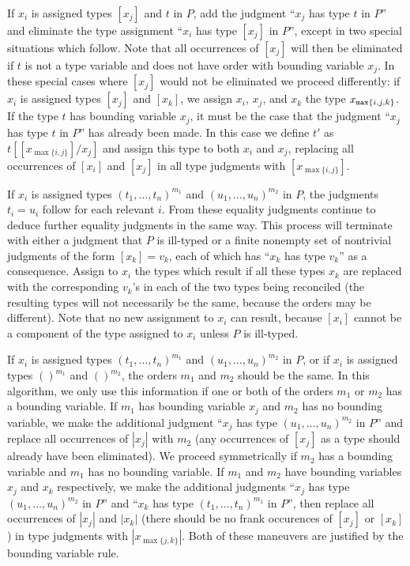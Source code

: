 \documentclass{article}
\begin{document}
\begin{description}
If $x_i$ is assigned types $[x_j]$ and $t$ in $P$, add the judgment
``$x_j$ has type $t$ in $P$'' and eliminate the type assignment
``$x_i$ has type $[x_j]$ in $P$'', except in two special situations
which follow.  Note that all occurrences of $[x_j]$ will then be
eliminated if $t$ is not a type variable and does not have order with
bounding variable $x_j$.  In these special cases where $[x_j]$ would
not be eliminated we proceed differently: if $x_i$ is assigned types
$[x_j]$ and $[x_k]$, we assign $x_i$, $x_j$, and $x_k$ the type
$x_{{\tt max}\{i,j,k\}}$.  If the type $t$ has bounding variable
$x_j$, it must be the case that the judgment ``$x_j$ has type $t$ in
$P$'' has already been made.  In this case we define $t'$ as
$t[[x_{\max\{i,j\}}]/x_j]$ and assign this type to both $x_i$ and
$x_j$, replacing all occurrences of $[x_i]$ and $[x_j]$ in all type
judgments with $[x_{\max\{i,j\}}]$.

If $x_i$ is assigned types $(t_1,\ldots,t_n)^{m_1}$ and
$(u_1,\ldots,u_n)^{m_2}$ in $P$, the judgments $t_i=u_i$ follow for
each relevant $i$.  From these equality judgments continue to deduce
further equality judgments in the same way.  This process will
terminate with either a judgment that $P$ is ill-typed or a finite
nonempty set of nontrivial judgments of the form $[x_k] = v_k$, each
of which has ``$x_k$ has type $v_k$'' as a consequence.  Assign to
$x_i$ the types which result if all these types $x_k$ are replaced
with the corresponding $v_k$'s in each of the two types being
reconciled (the resulting types will not necessarily be the same,
because the orders may be different).  Note that no new assignment to
$x_i$ can result, because $[x_i]$ cannot be a component of the type
assigned to $x_i$ unless $P$ is ill-typed.

If $x_i$ is assigned types $(t_1,\ldots,t_n)^{m_1}$ and
$(u_1,\ldots,u_n)^{m_2}$ in $P$, or if $x_i$ is assigned types
$()^{m_1}$ and $()^{m_2}$, the orders $m_1$ and $m_2$ should be the
same.  In this algorithm, we only use this information if one or both
of the orders $m_1$ or $m_2$ has a bounding variable.  If $m_1$ has
bounding variable $x_j$ and $m_2$ has no bounding variable, we make
the additional judgment ``$x_j$ has type $(u_1,\ldots,u_n)^{m_2}$ in
$P$'' and replace all occurrences of $|x_j|$ with $m_2$ (any
occurrences of $[x_j]$ as a type should already have been eliminated).
We proceed symmetrically if $m_2$ has a bounding variable and $m_1$
has no bounding variable.  If $m_1$ and $m_2$ have bounding variables
$x_j$ and $x_k$ respectively, we make the additional judgments ``$x_j$
has type $(u_1,\ldots,u_n)^{m_2}$ in $P$'' and ``$x_k$ has type
$(t_1,\ldots,t_n)^{m_1}$ in $P$'', then replace all occurrences of
$|x_j|$ and $|x_k|$ (there should be no frank occurences of $[x_j]$ or
$[x_k]$) in type judgments with $|x_{\max\{j,k\}}|$.  Both of these
maneuvers are justified by the bounding variable rule.


\end{description}
\end{document}
